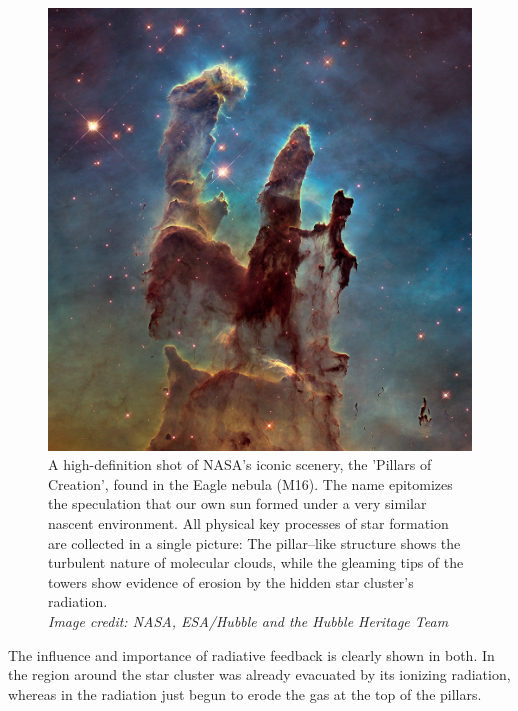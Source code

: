 \begin{figure}[ht]
 \centering
 \includegraphics[width=\textwidth]{Figures/pillars_of_creation}
 \captionsetup{justification=justified,singlelinecheck=false,width=\linewidth}
 \decoRule
 \caption[Pillars of Creation]{A high-definition shot of NASA's iconic scenery, the 'Pillars of Creation', found in the Eagle nebula (M16).
          The name epitomizes the speculation that our own sun formed under a very similar nascent environment.
          All physical key processes of star formation are collected in a single picture:
          The pillar--like structure shows the turbulent nature of molecular clouds, while the gleaming tips of the towers show evidence of erosion by the hidden star cluster's radiation. \\
          \textit{Image credit: NASA, ESA/Hubble and the Hubble Heritage Team}
 }
 \label{fig:Pillars_of_creation}
\end{figure}

The influence and importance of radiative feedback is clearly shown in  both.
In  the region around the star cluster was already evacuated by its ionizing radiation, whereas in  the radiation just begun to erode the gas at the top of the pillars.

